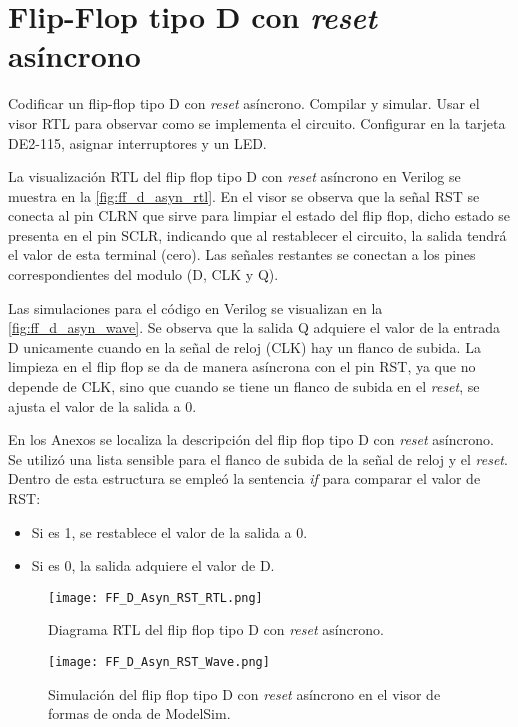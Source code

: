 \section{Flip-Flop tipo D con \textit{reset} asíncrono \label{sec:s1}}

\begin{center}
	\begin{minipage}{12cm}
		\begin{tcolorbox}[title=Actividad 1]
			Codificar un flip-flop tipo D con \textit{reset} asíncrono. Compilar y simular. Usar el visor RTL para observar como se implementa el circuito. Configurar en la tarjeta DE2-115, asignar interruptores y un LED.
		\end{tcolorbox}	
	\end{minipage}
\end{center}

La visualización RTL del flip flop tipo D con \textit{reset} asíncrono en Verilog se muestra en la \autoref{fig:ff_d_asyn_rtl}. En el visor se observa que la señal RST se conecta al pin CLRN que sirve para limpiar el estado del flip flop, dicho estado se presenta en el pin SCLR, indicando que al restablecer el circuito, la salida tendrá el valor de esta terminal (cero). Las señales restantes se conectan a los pines correspondientes del modulo (D, CLK y Q).

Las simulaciones para el código en Verilog se visualizan en la \autoref{fig:ff_d_asyn_wave}. Se observa que la salida Q adquiere el valor de la entrada D unicamente cuando en la señal de reloj (CLK) hay un flanco de subida. La limpieza en el flip flop se da de manera asíncrona con el pin RST, ya que no depende de CLK, sino que cuando se tiene un flanco de subida en el \textit{reset}, se ajusta el valor de la salida a 0.

En los Anexos se localiza la descripción del flip flop tipo D con \textit{reset} asíncrono. Se utilizó una lista sensible para el flanco de subida de la señal de reloj y el \textit{reset}. Dentro de esta estructura se empleó la sentencia \textit{if} para comparar el valor de RST: 
\begin{itemize}
	\item Si es 1, se restablece el valor de la salida a 0. 
	\item Si es 0, la salida adquiere el valor de D.
\end{itemize}

\begin{figure}[ht]
	\centering
	\texttt{[image: FF\_D\_Asyn\_RST\_RTL.png]}
	\caption{Diagrama RTL del flip flop tipo D con \textit{reset} asíncrono. \label{fig:ff_d_asyn_rtl}}
\end{figure}

\begin{figure}[ht]
	\centering
	\texttt{[image: FF\_D\_Asyn\_RST\_Wave.png]}
	\caption{Simulación del flip flop tipo D con \textit{reset} asíncrono en el visor de formas de onda de ModelSim. \label{fig:ff_d_asyn_wave}}
\end{figure}